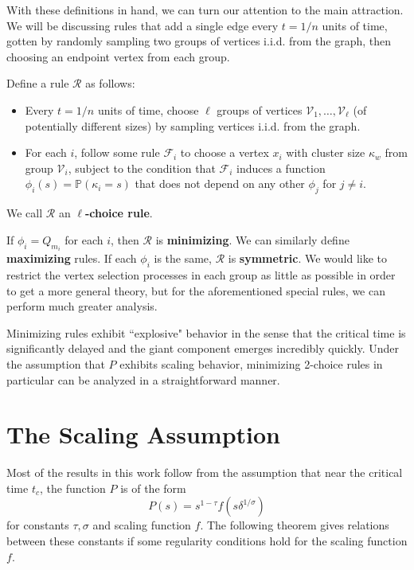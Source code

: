 \documentclass[twoside,10pt]{article}
\begin{document}
With these definitions in hand, we can turn our attention to the main attraction. We will be discussing rules that add a single edge every $t=1/n$ units of time, gotten by randomly sampling two groups of vertices i.i.d. from the graph, then choosing an endpoint vertex from each group.

\begin{defn}[]
	Define a rule $\mathcal{R}$ as follows:
	\begin{itemize}
		\item Every $t=1/n$ units of time, choose $\ell$ groups of vertices $\mathcal{V}_1, \dots, \mathcal{V}_{\ell}$ (of potentially different sizes) by sampling vertices i.i.d. from the graph.
		\item For each $i$, follow some rule $\mathcal{F}_{i}$ to choose a vertex $x_i$ with cluster size $\kappa_w$ from group $\mathcal{V}_i$, subject to the condition that $\mathcal{F}_i$ induces a function $\phi_i(s) = \mathbb{P}\left( \kappa_i=s \right) $ that does not depend on any other $\phi_j$ for $j \neq i$.
	\end{itemize}
We call $\mathcal{R}$ an \textbf{$\ell$-choice rule}.
\end{defn}

If $\phi_{i}=Q_{m_i}$ for each $i$, then $\mathcal{R}$ is \textbf{minimizing}. We can similarly define \textbf{maximizing} rules. If each $\phi_i$ is the same, $\mathcal{R}$ is \textbf{symmetric}. We would like to restrict the vertex selection processes in each group as little as possible in order to get a more general theory, but for the aforementioned special rules, we can perform much greater analysis. 

Minimizing rules exhibit ``explosive" behavior in the sense that the critical time is significantly delayed and the giant component emerges incredibly quickly. Under the assumption that $P$ exhibits scaling behavior, minimizing 2-choice rules in particular can be analyzed in a straightforward manner.

\section{The Scaling Assumption}


Most of the results in this work follow from the assumption that near the critical time $t_c$, the function $P$ is of the form
\[
	P(s) = s^{1-\tau}f(s \delta^{1/\sigma})
\] for constants $\tau,\sigma$ and scaling function $f$. The following theorem gives relations between these constants if some regularity conditions hold for the scaling function $f$.
\end{document}
